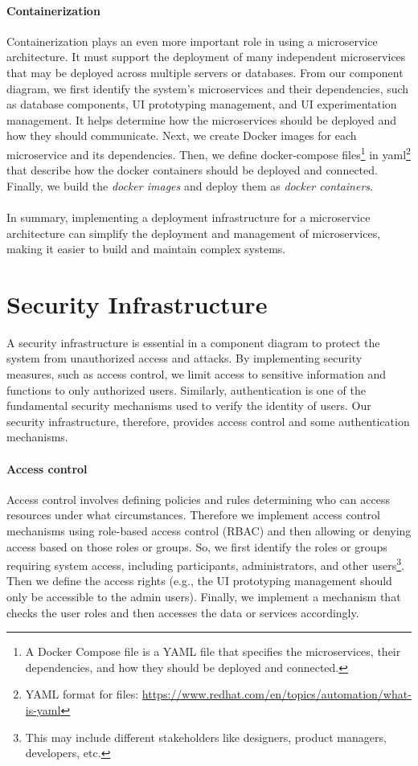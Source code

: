 \paragraph{Containerization}
Containerization plays an even more important role in using a microservice architecture. 
It must support the deployment of many independent microservices that may be deployed across multiple servers or databases.
From our component diagram, we first identify the system's microservices and their dependencies, such as database components, UI prototyping management, and UI experimentation management. 
It helps determine how the microservices should be deployed and how they should communicate.
Next, we create Docker images for each microservice and its dependencies.
Then, we define docker-compose files\footnote{A Docker Compose file is a YAML file that specifies the microservices, their dependencies, and how they should be deployed and connected.} in yaml\footnote{YAML format for files: \url{https://www.redhat.com/en/topics/automation/what-is-yaml}} that describe how the docker containers should be deployed and connected.
Finally, we build the \textit{docker images} and deploy them as \textit{docker containers}. \\\\
In summary, implementing a deployment infrastructure for a microservice architecture can simplify the deployment and management of microservices, making it easier to build and maintain complex systems.

\clearpage
\section{Security Infrastructure}
\label{sc:section:security}
A security infrastructure is essential in a component diagram to protect the system from unauthorized access and attacks. 
By implementing security measures, such as access control, we limit access to sensitive information and functions to only authorized users.
Similarly, authentication is one of the fundamental security mechanisms used to verify the identity of users.
Our security infrastructure, therefore, provides access control and some authentication mechanisms.

\paragraph{Access control}
Access control involves defining policies and rules determining who can access resources under what circumstances.
Therefore we implement access control mechanisms using role-based access control (RBAC) and then allowing or denying access based on those roles or groups.
So, we first identify the roles or groups requiring system access, including participants, administrators, and other users\footnote{This may include different stakeholders like designers, product managers, developers, etc.}. 
Then we define the access rights (e.g., the UI prototyping management should only be accessible to the admin users).
Finally, we implement a mechanism that checks the user roles and then accesses the data or services accordingly. 

